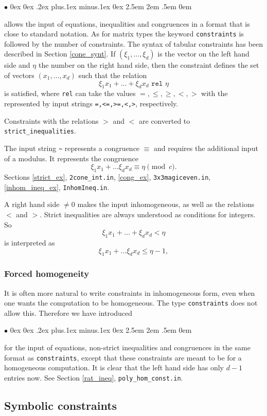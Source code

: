 \documentclass[12pt,a4paper]{scrartcl}
\newcommand{\stdli}{ \topsep0ex \partopsep0ex %
\parsep.2ex plus.1ex minus.1ex \itemsep0ex%
\leftmargin2.5em \labelwidth2em \labelsep.5em \rightmargin0em}%
\renewenvironment{itemize}{\begin{list}{{$\bullet$}}{\stdli}}{\end{list}}
\theoremstyle{definition}
\def\itemtt[#1]{\item[\textbf{\ttt{#1}}]}
\def\ttt{\texttt}
\begin{document}
\begin{itemize}
	\itemtt[constraints] allows the input of equations, inequalities and congruences in a format that is close to standard notation. As for matrix types the keyword \verb|constraints| is followed by the number of constraints. The syntax of tabular constraints has been described in Section \ref{cone_synt}. If $(\xi_1,\dots,\xi_d)$ is the vector on the left hand side and $\eta$ the number on the right hand side, then the constraint defines the set of vectors $(x_1,\dots,x_d)$ such that the relation
	$$
		\xi_1x_1+\dots +\xi_dx_d \texttt{ rel } \eta
	$$
	is satisfied, where \verb|rel| can take the values $=,\leq,\geq,<,>$ with the represented by input strings \verb|=,<=,>=,<,>|, respectively.
	
	Constraints with the  relations $>$ and $<$ are converted to \verb|strict_inequalities|.
	
	The input string \verb|~| represents a congruence $\equiv$ and requires the additional input of a modulus. It represents the congruence
	$$
	\xi_1x_1+\dots \xi_dx_d \equiv \eta \pmod c. 
	$$
	Sections \ref{strict_ex}, \verb|2cone_int.in|,  \ref{cong_ex}, \ttt{3x3magiceven.in}, \ref{inhom_ineq_ex}, \verb|InhomIneq.in|.
\end{itemize}

A right hand side $\neq 0$ makes the input inhomogeneous, as well as the relations $<$ and $>$. Strict inequalities are always understood as conditions for integers. So
$$
\xi_1x_1+\dots +\xi_dx_d < \eta
$$
is interpreted as
$$
\xi_1x_1+\dots \xi_dx_d \le \eta-1,
$$


\subsubsection{Forced homogeneity}

It is often more natural to write constraints in inhomogeneous form, even when one wants the computation to be homogeneous. The type \verb|constraints| does not allow this. Therefore we have introduced
\begin{itemize}
	\itemtt[hom\_constraints] for the input of equations, non-strict inequalities and congruences in the same format as \verb|constraints|, except that these constraints are meant to be for a homogeneous computation. It is clear that the left hand side has only $d-1$ entries now. See Section \ref{rat_ineq}, \verb|poly_hom_const.in|.
\end{itemize}

\subsection{Symbolic constraints}
\end{document}
